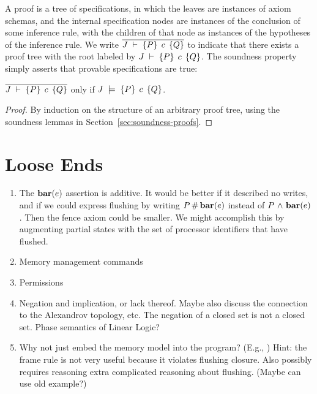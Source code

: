 \documentclass[11pt]{report}
\begin{document}
A proof is a tree of specifications, in which the leaves are instances of axiom schemas, and the internal specification nodes are instances of the conclusion of some inference rule, with the children of that node as instances of the hypotheses of the inference rule. We write $\overline{J\;\vdash\;\left\lbrace P \right\rbrace\;c\;\left\lbrace Q \right\rbrace}$ to indicate that there exists a proof tree with the root labeled by $J\;\vdash\;\left\lbrace P \right\rbrace\;c\;\left\lbrace Q \right\rbrace$. The soundness property simply asserts that provable specifications are true: 

\begin{theorem}[Soundness]
	$\overline{J\;\vdash\;\left\lbrace P \right\rbrace\;c\;\left\lbrace Q \right\rbrace}$ only if $J\;\models\;\left\lbrace P \right\rbrace\;c\;\left\lbrace Q \right\rbrace$. 
\end{theorem}

\begin{proof}
	By induction on the structure of an arbitrary proof tree, using the soundness lemmas in Section~\ref{sec:soundness-proofs}. 
\end{proof}

\chapter{Loose Ends}

\begin{enumerate}
	\item The $\mathbf{bar}(e)$ assertion is additive. It would be better if it described no writes, and if we could express flushing by writing $P \operatorname{\#} \mathbf{bar}(e)$ instead of $P \operatorname{\,\wedge\,} \mathbf{bar}(e)$. Then the fence axiom could be smaller. We might accomplish this by augmenting partial states with the set of processor identifiers that have flushed.  

    \item Memory management commands  \cite{wmsldetails,lola11}

    \item Permissions \cite{DBLP:conf/sas/Boyland03,DBLP:conf/popl/BornatCOP05,ParkinsonDissertation,DBLP:conf/aplas/DockinsHA09,lola11}

    \item Negation and implication, or lack thereof. Maybe also discuss the connection to the Alexandrov topology, etc. The negation of a closed set is not a closed set. Phase semantics of Linear Logic? 

    \item Why not just embed the memory model into the program? (E.g., \cite{DBLP:conf/tphol/Ridge07}) Hint: the frame rule is not very useful because it violates flushing closure. Also possibly requires reasoning extra complicated reasoning about flushing.  (Maybe can use old example?)
\end{enumerate}
\end{document}
